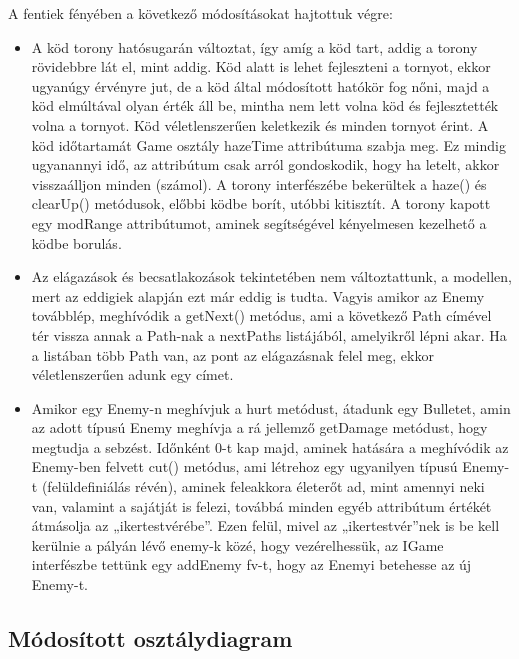 A fentiek fényében a következő módosításokat hajtottuk végre:
\begin{itemize}


\item A köd torony hatósugarán változtat, így amíg a köd tart, addig a torony rövidebbre lát el, mint addig. Köd alatt is lehet fejleszteni a tornyot, ekkor ugyanúgy érvényre jut, de a köd által módosított hatókör fog nőni, majd a köd elmúltával olyan érték áll be, mintha nem lett volna köd és fejlesztették volna a tornyot. Köd véletlenszerűen keletkezik és minden tornyot érint. A köd időtartamát  Game osztály hazeTime attribútuma szabja meg. Ez mindig ugyanannyi idő, az attribútum csak arról gondoskodik, hogy ha letelt, akkor visszaálljon minden (számol). A torony interfészébe bekerültek a haze() és clearUp() metódusok, előbbi ködbe borít, utóbbi kitisztít. A torony kapott egy modRange attribútumot, aminek segítségével kényelmesen kezelhető a ködbe borulás.
\item Az elágazások és becsatlakozások tekintetében nem változtattunk, a modellen, mert az eddigiek alapján ezt már eddig is tudta. Vagyis amikor az Enemy továbblép, meghívódik a getNext() metódus, ami a következő Path címével tér vissza annak a Path-nak a nextPaths listájából, amelyikről lépni akar. Ha a listában több Path van, az pont az elágazásnak felel meg, ekkor véletlenszerűen adunk egy címet.
\item Amikor egy Enemy-n meghívjuk a hurt metódust, átadunk egy Bulletet, amin az adott típusú Enemy meghívja a rá jellemző getDamage metódust, hogy megtudja a sebzést. Időnként 0-t kap majd, aminek hatására a meghívódik az Enemy-ben felvett cut() metódus, ami létrehoz egy ugyanilyen típusú Enemy-t (felüldefiniálás révén), aminek feleakkora életerőt ad, mint amennyi neki van, valamint a sajátját is felezi, továbbá minden egyéb attribútum értékét átmásolja az „ikertestvérébe”. Ezen felül, mivel az „ikertestvér”nek is be kell kerülnie a pályán lévő enemy-k közé, hogy vezérelhessük, az IGame interfészbe tettünk egy addEnemy fv-t, hogy az Enemyi betehesse az új Enemy-t.
\end{itemize}
\subsection{Módosított osztálydiagram}


